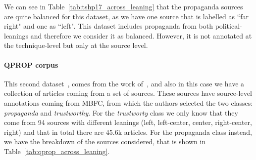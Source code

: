 We can see in Table~\ref{tab:tshp17_across_leaning} that the propaganda sources are quite balanced for this dataset, as we have one source that is labelled as ``far right" and one as ``left".
This dataset includes propaganda from both political-leanings and therefore we consider it as balanced. However, it is not annotated at the technique-level but only at the source level.


\paragraph{QPROP corpus}

This second dataset~\citep{alberto_barron_cedeno_2019_3271522}, comes from the work of~\cite{barron2019proppy}, and also in this case we have a collection of articles coming from a set of sources. These sources have source-level annotations coming from MBFC, from which the authors selected the two classes: \emph{propaganda} and \emph{trustworthy}.
For the \textit{trustworty} class we only know that they come from 94 sources with different leanings (left, left-center, center, right-center, right) and that in total there are 45.6k articles.
For the propaganda class instead, we have the breakdown of the sources considered, that is shown in Table~\ref{tab:qprop_across_leaning}.



